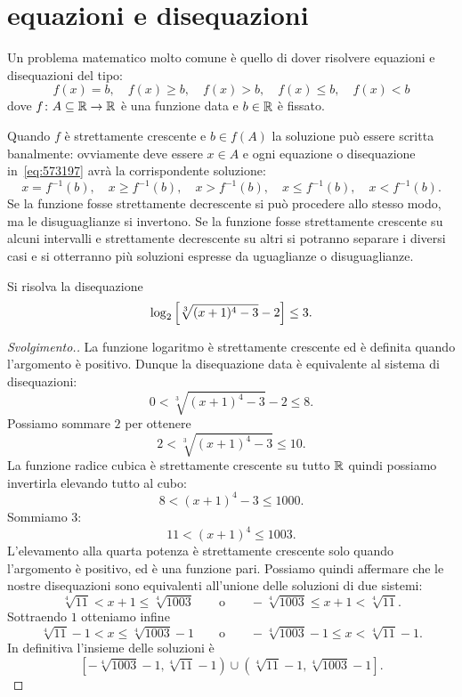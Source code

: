 \section{equazioni e disequazioni}

Un problema matematico molto comune è quello di dover risolvere 
equazioni e disequazioni del tipo:
\begin{equation}\label{eq:573197}
  f(x) = b, \quad f(x) \ge b, \quad f(x) > b, 
  \quad f(x) \le b, \quad f(x) < b
\end{equation}
dove $f\colon A \subseteq {\mathbb R} \to{\mathbb R}$ è una funzione data e 
$b\in {\mathbb R}$ è fissato.

Quando $f$ è strettamente crescente e $b\in f(A)$ 
la soluzione può essere 
scritta banalmente: 
ovviamente deve essere $x\in A$
e ogni equazione o disequazione in~\eqref{eq:573197}
avrà la corrispondente soluzione:
\[
  x= f^{-1}(b), \quad x \ge f^{-1}(b), \quad x>f^{-1}(b),
  \quad x \le f^{-1}(b), \quad x < f^{-1}(b).
\]
Se la funzione fosse strettamente decrescente 
si può procedere allo stesso modo, ma le disuguaglianze si invertono.
Se la funzione fosse strettamente crescente su alcuni intervalli 
e strettamente decrescente su altri si potranno separare i diversi 
casi e si otterranno più soluzioni espresse da uguaglianze
o disuguaglianze.

\begin{example}
  Si risolva la disequazione 
  \[
   \log_2{\left[ \sqrt[3]{(x+1)^4-3}-2 \right]} \le 3. 
  \]
\end{example}%
\begin{proof}[Svolgimento.]
La funzione logaritmo è strettamente crescente ed è definita 
quando l'argomento è positivo. 
Dunque la disequazione data 
è equivalente al sistema di disequazioni:
\[
0 < \sqrt[3]{(x+1)^4 - 3} - 2 \le 8.  
\]
Possiamo sommare $2$ per ottenere 
\[
  2 < \sqrt[3]{(x+1)^4 - 3} \le 10.  
\]
La funzione radice cubica è strettamente crescente 
su tutto ${\mathbb R}$ quindi possiamo invertirla elevando 
tutto al cubo:
\[
 8 < (x+1)^4 - 3 \le 1000.
\]
Sommiamo $3$:
\[
11 < (x+1)^4 \le 1003.  
\]
L'elevamento alla quarta potenza è strettamente crescente 
solo quando l'argomento è positivo, ed è una funzione pari.
Possiamo quindi affermare che le nostre disequazioni sono 
equivalenti all'unione delle soluzioni di due sistemi:
\[
  \sqrt[4]{11} < x+1 \le \sqrt[4]{1003}
  \qquad\text{o}\qquad 
  -\sqrt[4]{1003} \le x+1 < \sqrt[4]{11}.
\]
Sottraendo $1$ otteniamo infine 
\[
  \sqrt[4]{11} -1 < x \le \sqrt[4]{1003} - 1
  \qquad\text{o}\qquad 
  -\sqrt[4]{1003} -1 \le x < \sqrt[4]{11} -1.
\]
In definitiva l'insieme delle soluzioni è 
\[
\left[-\sqrt[4]{1003} - 1, \sqrt[4]{11}-1\right)
\cup \left(\sqrt[4]{11}-1 , \sqrt[4]{1003} -1\right].  
\]
\end{proof}

